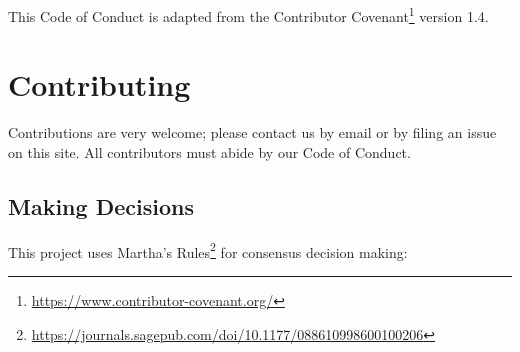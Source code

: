 \documentclass[krantzl]{krantz}
\newcommand{\hreffoot}[2]{{#1}\footnote{\href{#2}{#2}}}
\begin{document}
This Code of Conduct is adapted from the \hreffoot{Contributor Covenant}{https://www.contributor-covenant.org/}
version 1.4.

\chapter{Contributing}\label{contributing}

Contributions are very welcome;
please contact us by email or by filing an issue on this site.
All contributors must abide by our Code of Conduct.

\section*{Making Decisions}


This project uses \hreffoot{Martha’s Rules}{https://journals.sagepub.com/doi/10.1177/088610998600100206} for consensus decision making:
\end{document}
